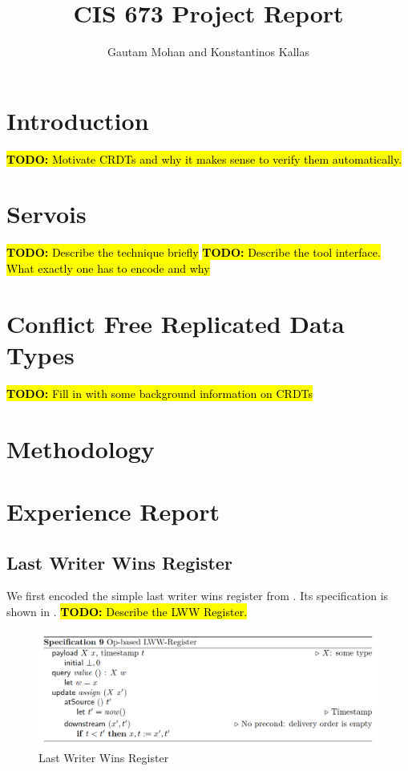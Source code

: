 \documentclass{article}
\newcommand{\TODO}[1]{\hl{\textbf{TODO:} #1}\xspace}
\begin{document}
\title{CIS 673 Project Report}
\author{Gautam Mohan and Konstantinos Kallas}


\maketitle

\section{Introduction}

\TODO{Motivate CRDTs and why it makes sense to verify them
  automatically.}

\section{Servois}

\TODO{Describe the technique briefly} \TODO{Describe the tool
  interface. What exactly one has to encode and why}

\section{Conflict Free Replicated Data Types}

\TODO{Fill in with some background information on CRDTs}~\cite{shapiro2011conflict}

\section{Methodology}

\section{Experience Report}


\subsection{Last Writer Wins Register}

We first encoded the simple last writer wins register from
\cite{shapiro2011comprehensive}. Its specification is shown in
. \TODO{Describe the LWW Register.}

\begin{figure}[h]
    \centering
    \includegraphics[width=\textwidth]{lww-definition}
    \caption{Last Writer Wins Register}
    \label{fig:lww-def}
\end{figure}
\end{document}
